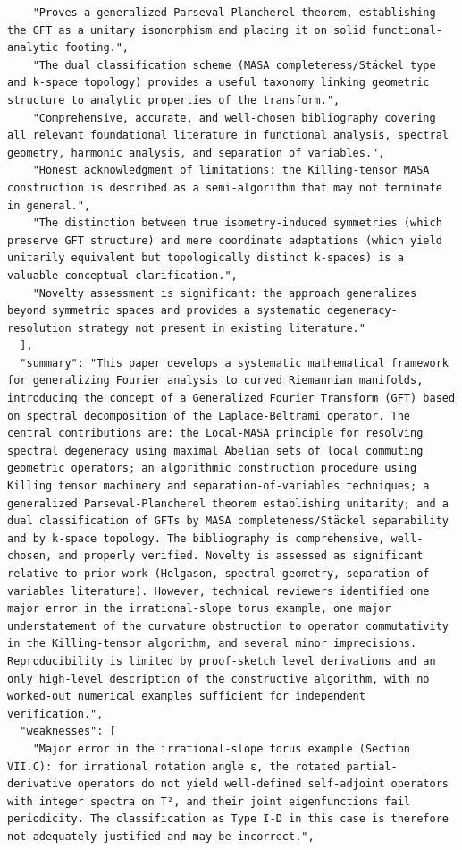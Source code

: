 \documentclass[11pt]{article}
\begin{document}
\begin{verbatim}
    "Proves a generalized Parseval-Plancherel theorem, establishing the GFT as a unitary isomorphism and placing it on solid functional-analytic footing.",
    "The dual classification scheme (MASA completeness/Stäckel type and k-space topology) provides a useful taxonomy linking geometric structure to analytic properties of the transform.",
    "Comprehensive, accurate, and well-chosen bibliography covering all relevant foundational literature in functional analysis, spectral geometry, harmonic analysis, and separation of variables.",
    "Honest acknowledgment of limitations: the Killing-tensor MASA construction is described as a semi-algorithm that may not terminate in general.",
    "The distinction between true isometry-induced symmetries (which preserve GFT structure) and mere coordinate adaptations (which yield unitarily equivalent but topologically distinct k-spaces) is a valuable conceptual clarification.",
    "Novelty assessment is significant: the approach generalizes beyond symmetric spaces and provides a systematic degeneracy-resolution strategy not present in existing literature."
  ],
  "summary": "This paper develops a systematic mathematical framework for generalizing Fourier analysis to curved Riemannian manifolds, introducing the concept of a Generalized Fourier Transform (GFT) based on spectral decomposition of the Laplace-Beltrami operator. The central contributions are: the Local-MASA principle for resolving spectral degeneracy using maximal Abelian sets of local commuting geometric operators; an algorithmic construction procedure using Killing tensor machinery and separation-of-variables techniques; a generalized Parseval-Plancherel theorem establishing unitarity; and a dual classification of GFTs by MASA completeness/Stäckel separability and by k-space topology. The bibliography is comprehensive, well-chosen, and properly verified. Novelty is assessed as significant relative to prior work (Helgason, spectral geometry, separation of variables literature). However, technical reviewers identified one major error in the irrational-slope torus example, one major understatement of the curvature obstruction to operator commutativity in the Killing-tensor algorithm, and several minor imprecisions. Reproducibility is limited by proof-sketch level derivations and an only high-level description of the constructive algorithm, with no worked-out numerical examples sufficient for independent verification.",
  "weaknesses": [
    "Major error in the irrational-slope torus example (Section VII.C): for irrational rotation angle ε, the rotated partial-derivative operators do not yield well-defined self-adjoint operators with integer spectra on T², and their joint eigenfunctions fail periodicity. The classification as Type I-D in this case is therefore not adequately justified and may be incorrect.",

\end{verbatim}
\end{document}

